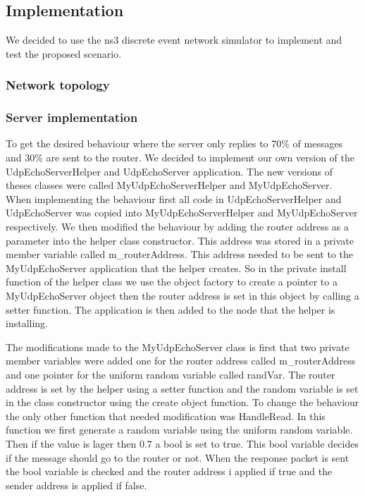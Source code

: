 \documentclass{article}
\begin{document}
\subsection{Implementation}
We decided to use the ns3 discrete event network simulator to implement and test the proposed scenario.



\subsubsection{Network topology}

\subsubsection{Server implementation}
To get the desired behaviour where the server only replies to 70\% of messages and 30\% are sent to the router.
We decided to implement our own version of the UdpEchoServerHelper and UdpEchoServer application.
The new versions of theses classes were called MyUdpEchoServerHelper and MyUdpEchoServer.
When implementing the behaviour first all code in UdpEchoServerHelper and UdpEchoServer was copied into MyUdpEchoServerHelper and MyUdpEchoServer respectively.
We then modified the behaviour by adding the router address as a parameter into the helper class constructor.
This address was stored in a private member variable called m\_routerAddress.
This address needed to be sent to the MyUdpEchoServer application that the helper creates.
So in the private install function of the helper class we use the object factory to create a pointer to a MyUdpEchoServer object then the router address is set in this object by calling a setter function.
The application is then added to the node that the helper is installing.

The modifications made to the MyUdpEchoServer class is first that two private member variables were added one for the router address called m\_routerAddress and one pointer for the uniform random variable called randVar.
The router address is set by the helper using a setter function and the random variable is set in the class constructor using the create object function.
To change the behaviour the only other function that needed modification was HandleRead.
In this function we first generate a random variable using the uniform random variable.
Then if the value is lager then 0.7 a bool is set to true.
This bool variable decides if the message should go to the router or not.
When the response packet is sent the bool variable is checked and the router address i applied if true and the sender address is applied if false.
\end{document}
